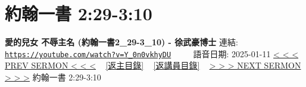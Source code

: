 \documentclass{book}
\begin{document}
\section{約翰一書 2:29-3:10}
\label{sec:Y_0n0vkhyDU}
\textbf{愛的兒女 不辱主名 (約翰一書2\_29-3\_10) - 徐武豪博士}
\newline
\newline
連結: \href{https://youtube.com/watch?v=Y_0n0vkhyDU}{\texttt{https://youtube.com/watch?v=Y\_0n0vkhyDU}} ~~~~ 語音日期: 2025-01-11
\newline
\newline
\hyperref[sec:pb5NDTZL6gI]{< < < PREV SERMON < < <}
~
\hyperlink{toc}{[返主目錄]}
~
\hyperref[ch:preacher4]{[返講員目錄]}
~
\hyperref[sec:K8E95o7ZcvU]{> > > NEXT SERMON > > >}
\newline
\newline
約翰一書 2:29-3:10
\newline
\end{document}
